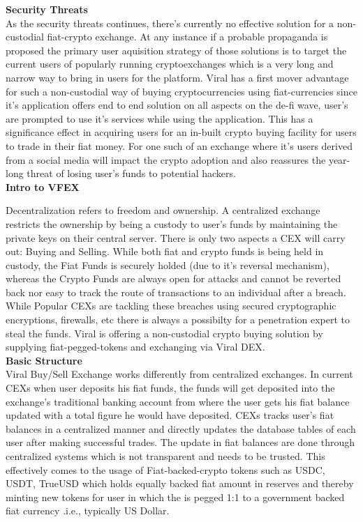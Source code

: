 \documentclass[10pt]{article}
\begin{document}
\textbf{Security Threats}\\

As the security threats continues, there's currently no effective solution for a non-custodial fiat-crypto exchange. At any instance if a probable propaganda is proposed the primary user aquisition strategy of those solutions is to target the current users of popularly running cryptoexchanges which is a very long and narrow way to bring in users for the platform. Viral has a first mover advantage for such a non-custodial way of buying cryptocurrencies using fiat-currencies since it's application offers end to end solution on all aspects on the de-fi wave, user's are prompted to use it's services while using the application. This has a significance effect in acquiring users for an in-built crypto buying facility for users to trade in their fiat money. For one such of an exchange where it's users derived from a social media will impact the crypto adoption and also reassures the year-long threat of losing user's funds to potential hackers.\\

\textbf{Intro to VFEX}

Decentralization refers to freedom and ownership. A centralized exchange restricts the ownership by being a custody to user's funds by maintaining the private keys on their central server. There is only two aspects a CEX will carry out: Buying and Selling. While both fiat and crypto funds is being held in custody, the Fiat Funds is securely holded (due to it's reversal mechanism), whereas the Crypto Funds are always open for attacks and cannot be reverted back nor easy to track the route of transactions to an individual after a breach. While Popular CEXs are tackling these breaches using secured cryptographic encryptions, firewalls, etc there is always a possibilty for a penetration expert to steal the funds. Viral is offering a non-custodial crypto buying solution by supplying fiat-pegged-tokens and exchanging via Viral DEX.\\

\textbf{Basic Structure}\\

Viral Buy/Sell Exchange works differently from centralized exchanges. In current CEXs when user deposits his fiat funds, the funds will get deposited into the exchange's traditional banking account from where the user gets his fiat balance updated with a total figure he would have deposited. CEXs tracks user's fiat balances in a centralized manner and directly updates the database tables of each user after making successful trades. The update in fiat balances are done through centralized systems which is not transparent and needs to be trusted. This effectively comes to the usage of Fiat-backed-crypto tokens such as USDC, USDT, TrueUSD which holds equally backed fiat amount in reserves and thereby minting new tokens for user in which the is pegged 1:1 to a government backed fiat currency .i.e., typically US Dollar.\\
\end{document}
